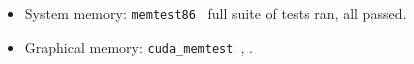\documentclass[runningheads,twocolumn,a4paper,10pt]{llncs}
\begin{document}
\begin{itemize}[leftmargin=*]
    \item System memory: \texttt{memtest86}~\cite{MemTest86} full suite of tests ran, all passed.
    \item Graphical memory: \texttt{cuda\_memtest}~\cite{cuda_memtest}, \cite{shi2009testing}.
\end{itemize}









\end{document}

